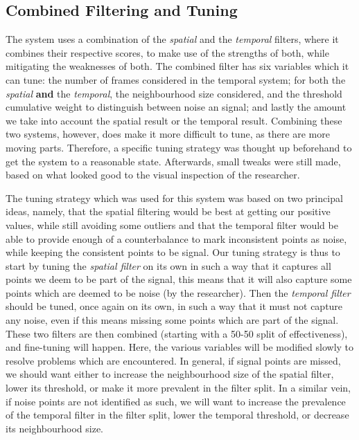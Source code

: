 \subsection{Combined Filtering and Tuning}
\label{sub-section: tracking method - data filtering - combined filtering and tuning}

The system uses a combination of the \textit{spatial} and the \textit{temporal} filters, where it combines their respective scores, to make use of the strengths of both, while mitigating the weaknesses of both.
The combined filter has six variables which it can tune: the number of frames considered in the temporal system; for both the \textit{spatial} \textbf{and} the \textit{temporal}, the neighbourhood size considered, and the threshold cumulative weight to distinguish between noise an signal; and lastly the amount we take into account the spatial result or the temporal result.
Combining these two systems, however, does make it more difficult to tune, as there are more moving parts.
Therefore, a specific tuning strategy was thought up beforehand to get the system to a reasonable state. Afterwards, small tweaks were still made, based on what looked good to the visual inspection of the researcher.

The tuning strategy which was used for this system was based on two principal ideas, namely, that the spatial filtering would be best at getting our positive values, while still avoiding some outliers and that the temporal filter would be able to provide enough of a counterbalance to mark inconsistent points as noise, while keeping the consistent points to be signal.
Our tuning strategy is thus to start by tuning the \textit{spatial filter} on its own in such a way that it captures all points we deem to be part of the signal, this means that it will also capture some points which are deemed to be noise (by the researcher).
Then the \textit{temporal filter} should be tuned, once again on its own, in such a way that it must not capture any noise, even if this means missing some points which are part of the signal.
These two filters are then combined (starting with a 50-50 split of effectiveness), and fine-tuning will happen. 
Here, the various variables will be modified slowly to resolve problems which are encountered.
In general, if signal points are missed, we should want either to increase the neighbourhood size of the spatial filter, lower its threshold, or make it more prevalent in the filter split.
In a similar vein, if noise points are not identified as such, we will want to increase the prevalence of the temporal filter in the filter split, lower the temporal threshold, or decrease its neighbourhood size.

